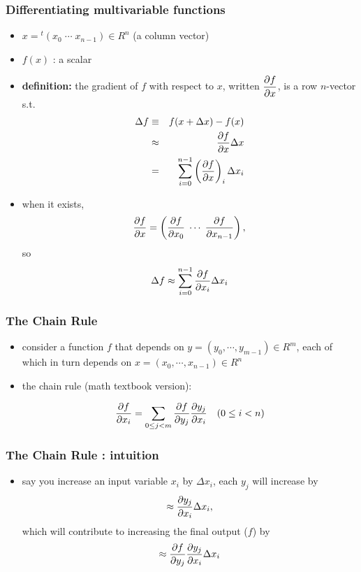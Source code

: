 \documentclass[12pt,dvipdfmx]{beamer}
\newcommand{\ao}[1]{{\color{blue}#1}}
\begin{document}
\begin{frame}
\frametitle{Differentiating multivariable functions}
\begin{itemize}
\item $x = {}^t(x_0 \; \cdots\; x_{n-1}) \in R^n$ (a column vector)
\item $f(x)$ : a scalar

\item \ao{\textbf{definition:}}
  the gradient of $f$ with respect to $x$, 
  written ${\displaystyle \frac{\partial f}{\partial x}}$,
  is \ao{a row $n$-vector} s.t.
  {\footnotesize
  \begin{eqnarray*}
    \Delta f & \equiv & f(x + \Delta x) - f(x) \\
             & \approx & \frac{\partial f}{\partial x} \Delta x \\
             & = & \sum_{i=0}^{n-1} \left(\frac{\partial f}{\partial x}\right)_i \Delta x_i
  \end{eqnarray*}}

\item when it exists, 
  {\footnotesize \[ \frac{\partial f}{\partial x} = \left(\frac{\partial f}{\partial x_0}\;\cdots\;\frac{\partial f}{\partial x_{n-1}}\right), \]}
  so
  \ao{\footnotesize\[ \Delta f \approx \sum_{i=0}^{n-1} \frac{\partial f}{\partial x_i} \Delta x_i \]}
\end{itemize}
\end{frame}


\begin{frame}
\frametitle{The Chain Rule}
\begin{itemize}
\item consider a function $f$ that depends on
  $y = (y_0, \cdots , y_{m-1}) \in R^{m}$,
  each of which in turn depends on $x = (x_0, \cdots , x_{n-1}) \in R^n$

\item \ao{the chain rule (math textbook version):}

  \[ \frac{\partial f}{\partial x_i} = \sum_{0 \leq j < m} \frac{\partial f}{\partial y_j} \frac{\partial y_j}{\partial x_i}
    \quad (0 \leq i < n)
  \]

\begin{center}
\def\svgwidth{0.45\textwidth}
{\scriptsize}
\end{center}

\end{itemize}
\end{frame}


\begin{frame}
\frametitle{The Chain Rule : intuition}
\begin{center}
\def\svgwidth{0.4\textwidth}
{\scriptsize}
\end{center}
\vskip-0.5cm
\begin{itemize}
\item say you increase an input variable $x_i$ by $\Delta x_i$, 
  each $y_j$ will increase by
  \[ \approx \frac{\partial y_j}{\partial x_i}\Delta x_i, \]
  which will contribute to increasing the final output ($f$) by
  \[ \approx \frac{\partial f}{\partial y_j} \frac{\partial y_j}{\partial x_i}\Delta x_i \]
\end{itemize}
\end{frame}
\end{document}
